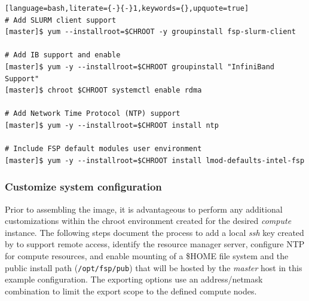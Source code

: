 \documentclass[letterpaper]{article}
\begin{document}
\newpage
\begin{lstlisting}[language=bash,literate={-}{-}1,keywords={},upquote=true]
# Add SLURM client support
[master]$ yum --installroot=$CHROOT -y groupinstall fsp-slurm-client

# Add IB support and enable
[master]$ yum -y --installroot=$CHROOT groupinstall "InfiniBand Support"
[master]$ chroot $CHROOT systemctl enable rdma

# Add Network Time Protocol (NTP) support
[master]$ yum -y --installroot=$CHROOT install ntp

# Include FSP default modules user environment
[master]$ yum -y --installroot=$CHROOT install lmod-defaults-intel-fsp
\end{lstlisting}




\subsubsection{Customize system configuration} \label{sec:master_customization}

Prior to assembling the image, it is advantageous to perform any additional
customizations within the chroot environment created for the desired {\em
  compute} instance. The following steps document the process to add a local
{\em ssh} key created by \Warewulf{} to support remote access, identify the
resource manager server, configure NTP for compute resources, and enable \NFS{}
mounting of a \$HOME file system and the public \FSP{} install path
(\texttt{/opt/fsp/pub}) that will be hosted by the {\em master} host in this
example configuration.  The \NFS{} exporting options use an address/netmask
combination to limit the export scope to the defined compute nodes.

\end{document}
